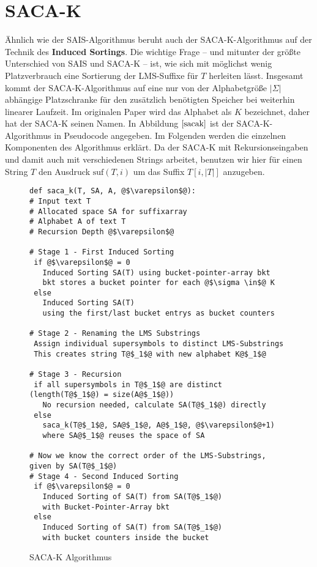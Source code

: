 \section{SACA-K}
\label{section:saca_k}

\newcommand {\suf} {\text{suf}}
\newcommand {\level} {\varepsilon}
\newcommand {\symbWidth} {0.3cm}

Ähnlich wie der SAIS-Algorithmus beruht auch der SACA-K-Algorithmus auf der Technik des \textbf{Induced Sortings}. Die wichtige Frage -- und mitunter der größte Unterschied von SAIS und SACA-K -- ist, wie sich mit möglichst wenig Platzverbrauch eine Sortierung der LMS-Suffixe für $T$ herleiten lässt. Insgesamt kommt der SACA-K-Algorithmus auf eine nur von der Alphabetgröße $|\Sigma|$ abhängige Platzschranke für den zusätzlich benötigten Speicher bei weiterhin linearer Laufzeit. Im originalen Paper wird das Alphabet als $K$ bezeichnet, daher hat der SACA-K seinen Namen. In Abbildung $\ref{sacak}$ ist der SACA-K-Algorithmus in Pseudocode angegeben. Im Folgenden werden die einzelnen Komponenten des Algorithmus erklärt. Da der SACA-K mit Rekursionseingaben und damit auch mit verschiedenen Strings arbeitet, benutzen wir hier für einen String $T$ den Ausdruck $\suf(T,i)$ um das Suffix $T[i,|T|]$ anzugeben.

\begin{figure}
\begin{verbatim}
def saca_k(T, SA, A, @$\varepsilon$@):
# Input text T
# Allocated space SA for suffixarray
# Alphabet A of text T
# Recursion Depth @$\varepsilon$@

# Stage 1 - First Induced Sorting
 if @$\varepsilon$@ = 0
   Induced Sorting SA(T) using bucket-pointer-array bkt 
   bkt stores a bucket pointer for each @$\sigma \in$@ K
 else
   Induced Sorting SA(T) 
   using the first/last bucket entrys as bucket counters
		
# Stage 2 - Renaming the LMS Substrings
 Assign individual supersymbols to distinct LMS-Substrings
 This creates string T@$_1$@ with new alphabet K@$_1$@
	
# Stage 3 - Recursion
 if all supersymbols in T@$_1$@ are distinct (length(T@$_1$@) = size(A@$_1$@))
   No recursion needed, calculate SA(T@$_1$@) directly
 else
   saca_k(T@$_1$@, SA@$_1$@, A@$_1$@, @$\varepsilon$@+1)
   where SA@$_1$@ reuses the space of SA

# Now we know the correct order of the LMS-Substrings, given by SA(T@$_1$@)
# Stage 4 - Second Induced Sorting
 if @$\varepsilon$@ = 0
   Induced Sorting of SA(T) from SA(T@$_1$@) 
   with Bucket-Pointer-Array bkt
 else
   Induced Sorting of SA(T) from SA(T@$_1$@) 
   with bucket counters inside the bucket

\end{verbatim}
\caption{SACA-K Algorithmus  \cite{saca:7}}
\label{sacak}
\end{figure}

